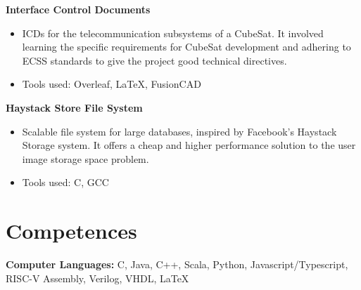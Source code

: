 \documentclass[a4paper, 10pt]{article}
\newenvironment{highlights}{
    \begin{itemize}[
        topsep=0.10 cm,
        parsep=0.10 cm,
        partopsep=0pt,
        itemsep=0pt,
        leftmargin=0.4 cm + 10pt
    ]
}{
    \end{itemize}
} %
\let\hrefWithoutArrow\href
\renewcommand{\href}[2]{\hrefWithoutArrow{#1}{\ifthenelse{\equal{#2}{}}{ }{#2 }\raisebox{.15ex}{\footnotesize \faExternalLink*}}}
\begin{document}
        \textbf{Interface Control Documents}\href{https://drive.google.com/drive/folders/1KWNjMkGwcYpTIh6xBs-nddBK195R_ihb?usp=sharing}{}
        \begin{highlights}
            \item ICDs for the telecommunication subsystems of a CubeSat. It involved learning the specific requirements for CubeSat development and adhering to ECSS standards to give the project good technical directives.
            \item Tools used: Overleaf, LaTeX, FusionCAD
        \end{highlights}

        \textbf{Haystack Store File System}\href{https://github.com/relogamimano/haystack-store}{}
        \begin{highlights}
            \item Scalable file system for large databases, inspired by Facebook's Haystack Storage system. It offers a cheap and higher performance solution to the user image storage space problem.
            \item Tools used: C, GCC
        \end{highlights}





        
        
    
    \section{Competences}
    \textbf{Computer Languages:} C, Java, C++, Scala, Python, Javascript/Typescript, RISC-V Assembly, Verilog, VHDL, LaTeX
    
\end{document}
